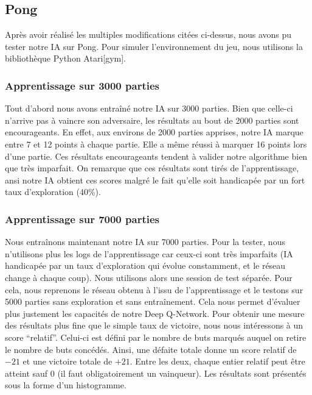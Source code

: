 \subsection{Pong}

Après avoir réalisé les multiples modifications citées ci-dessus, nous avons pu tester notre IA sur Pong. Pour simuler l'environnement du jeu, nous utilisons
la bibliothèque Python Atari[gym].

\subsubsection{Apprentissage sur 3000 parties}

Tout d'abord nous avons entraîné notre IA sur 3000 parties. Bien que celle-ci n'arrive pas à vaincre son adversaire, les résultats au bout de 2000 parties sont
encourageants. En effet, aux environs de 2000 parties apprises, notre IA marque entre 7 et 12 points à chaque partie. Elle a même réussi à marquer 16 points lors d'une
partie. Ces résultats encourageants tendent à valider notre algorithme bien que très imparfait. On remarque que ces résultats sont tirés de l'apprentissage, 
ansi notre IA obtient ces scores malgré le fait qu'elle soit handicapée par un fort taux d'exploration (40\%).

\subsubsection{Apprentissage sur 7000 parties}

Nous entraînons maintenant notre IA sur 7000 parties. Pour la tester, nous n'utilisons plus les logs de l'apprentissage car ceux-ci sont très imparfaits (IA handicapée par 
un taux d'exploration qui évolue constamment, et le réseau change à chaque coup). Nous utilisons alors une session de test séparée. Pour cela, nous reprenons le réseau
obtenu à l'issu de l'apprentissage et le testons sur 5000 parties sans exploration et sans entraînement. Cela nous permet d'évaluer plus justement les capacités
de notre Deep Q-Network. Pour obtenir une mesure des résultats plus fine que le simple taux de victoire, nous nous intéressons à un score ``relatif''. Celui-ci 
est défini par le nombre de buts marqués auquel on retire le nombre de buts concédés. Ainsi, une défaite totale donne un score relatif de $\num{-21}$ et une victoire totale 
de $+\num{21}$. Entre les deux, chaque entier relatif peut être atteint sauf 0 (il faut obligatoirement un vainqueur). Les résultats sont présentés sous la forme
d'un histogramme.

